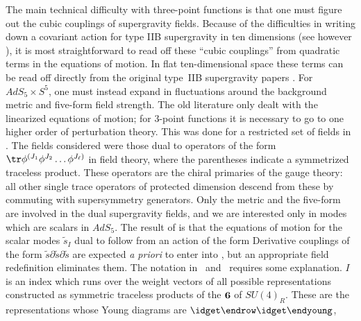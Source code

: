 The main technical difficulty with three-point functions is that one must
figure out the cubic couplings of supergravity fields.  Because of the
difficulties in writing down a covariant action for type IIB supergravity
in ten dimensions (see however
\cite{Dall'Agata:1997ju,Dall'Agata:1998va,Arutyunov:1998hf}), it is most
straightforward to read off these ``cubic couplings'' from quadratic terms
in the equations of motion.  In flat ten-dimensional space these terms can
be read off directly from the original type~IIB supergravity papers
\cite{Schwarz:1983qr,Howe:1984sr}.  For $AdS_5 \times S^5$, one must
instead expand in fluctuations around the background metric and five-form
field strength.  The old literature \cite{Kim:1985ez} only dealt with the
linearized equations of motion; for 3-point functions it is necessary to go
to one higher order of perturbation theory.  This was done for a restricted
set of fields in \cite{Lee:1998bx}.  The fields considered were those dual
to operators of the form $\tr \phi^{(J_1} \phi^{J_2} \ldots \phi^{J_\ell)}$
in field theory, where the parentheses indicate a symmetrized traceless
product.  These operators are the chiral primaries of the gauge theory: all
other single trace operators of protected dimension descend from these by
commuting with supersymmetry generators.  Only the metric and the five-form
are involved in the dual supergravity fields, and we are interested only in
modes which are scalars in $AdS_5$.  The result of \cite{Lee:1998bx} is
that the equations of motion for the scalar modes $\tilde{s}_I$ dual to
 follow from an action of the form
 Derivative couplings of the form $\tilde{s} \partial\tilde{s}
\partial\tilde{s}$ are expected {\it a priori} to enter into \lmrsAction,
but an appropriate field redefinition eliminates them.  The notation in
\lmrsOp\ and \lmrsAction\ requires some explanation.  $I$ is an index which
runs over the weight vectors of all possible representations constructed as
symmetric traceless products of the ${\bf 6}$ of $SU(4)_R$.  These are the
representations whose Young diagrams are
$\oalign{\idget\endrow\idget\endyoung}$,
